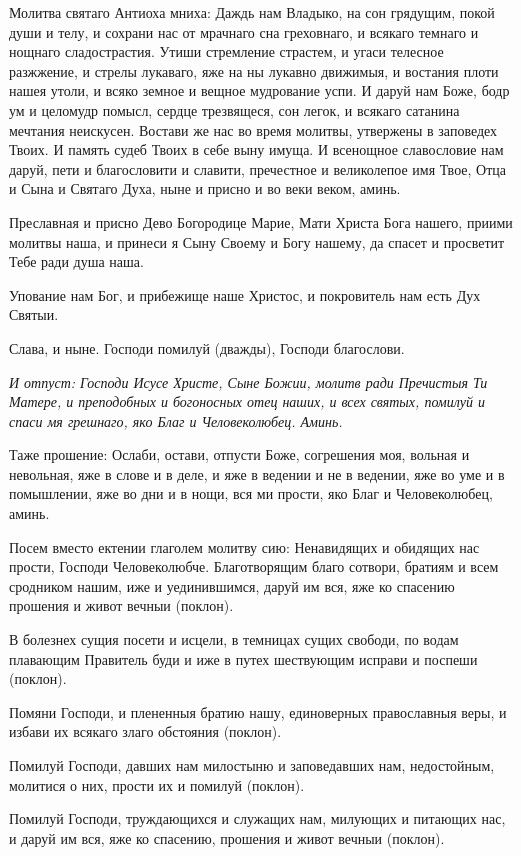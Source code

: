 Молитва святаго Антиоха мниха: Даждь нам Владыко, на сон грядущим, покой души и телу, и сохрани нас от мрачнаго сна греховнаго, и всякаго темнаго и нощнаго сладострастия. Утиши стремление страстем, и угаси телесное разжжение, и стрелы лукаваго, яже на ны лукавно движимыя, и востания плоти нашея утоли, и всяко земное и вещное мудрование успи. И даруй нам Боже, бодр ум и целомудр помысл, сердце трезвящеся, сон легок, и всякаго сатанина мечтания неискусен. Востави же нас во время молитвы, утвержены в заповедех Твоих. И память судеб Твоих в себе выну имуща. И всенощное славословие нам даруй, пети и благословити и славити, пречестное и великолепое имя Твое, Отца и Сына и Святаго Духа, ныне и присно и во веки веком, аминь.

Преславная и присно Дево Богородице Марие, Мати Христа Бога нашего, приими молитвы наша, и принеси я Сыну Своему и Богу нашему, да спасет и просветит Тебе ради душа наша.

Упование нам Бог, и прибежище наше Христос, и покровитель нам есть Дух Святыи.

Слава, и ныне. Господи помилуй (дважды), Господи благослови.


\itshape И отпуст:\normalfont{} Господи Исусе Христе, Сыне Божии, молитв ради Пречистыя Ти Матере, и преподобных и богоносных отец наших, и всех святых, помилуй и спаси мя грешнаго, яко Благ и Человеколюбец. Аминь. 

Таже прошение: Ослаби, остави, отпусти Боже, согрешения моя, вольная и невольная, яже в слове и в деле, и яже в ведении и не в ведении, яже во уме и в помышлении, яже во дни и в нощи, вся ми прости, яко Благ и Человеколюбец, аминь.

Посем вместо ектении глаголем молитву сию: Ненавидящих и обидящих нас прости, Господи Человеколюбче. Благотворящим благо сотвори, братиям и всем сродником нашим, иже и уединившимся, даруй им вся, яже ко спасению прошения и живот вечныи (поклон).

В болезнех сущия посети и исцели, в темницах сущих свободи, по водам плавающим Правитель буди и иже в путех шествующим исправи и поспеши (поклон).

Помяни Господи, и плененныя братию нашу, единоверных православныя веры, и избави их всякаго злаго обстояния (поклон).

Помилуй Господи, давших нам милостыню и заповедавших нам, недостойным, молитися о них, прости их и помилуй (поклон).

Помилуй Господи, труждающихся и служащих нам, милующих и питающих нас, и даруй им вся, яже ко спасению, прошения и живот вечныи (поклон).


